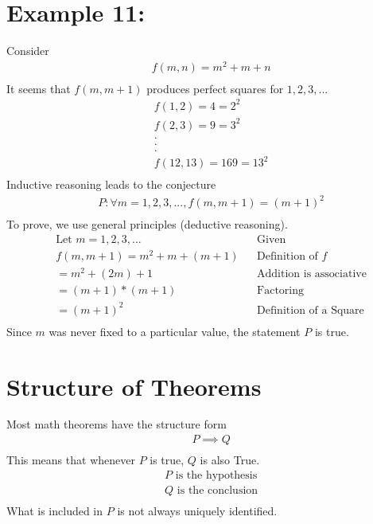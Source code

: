 \documentclass{article}
\begin{document}
\section{Example 11:}
Consider
\begin{align*}
	& f(m,n) = m^2 + m + n \\
\end{align*}
It seems that $f(m, m+1)$ produces perfect squares for $1,2,3,...$
\begin{align*}
	& f(1,2) = 4 = 2^2 \\
	& f(2,3) = 9 = 3^2 \\
	& . \\
	& . \\
	& . \\
	& f(12,13) = 169 = 13^2 \\
\end{align*}
Inductive reasoning leads to the conjecture
\begin{align*}
	& P: \forall m = 1,2,3,..., f(m, m+1) = (m+1)^2 \\
\end{align*}
To prove, we use general principles (deductive reasoning).\\
\begin{align*}
 	& \text{Let } m = 1,2,3,...  && \text{Given} \\
 	& f(m, m+1) = m^2 + m + (m + 1) && \text{Definition of }f \\
 	& = m^2 + (2m) + 1 && \text{Addition is associative} \\
 	& = (m+1) * (m+1) && \text{Factoring} \\
 	& = (m+1)^2 && \text{Definition of a Square}\\
\end{align*}
Since $m$ was never fixed to a particular value, the statement $P$ is true.
\section{Structure of Theorems}
Most math theorems have the structure form
\begin{align*}
 	& P \implies Q \\
\end{align*}
This means that whenever $P$ is true, $Q$ is also True.
\begin{align*}
 	& P \text{ is the hypothesis} \\
 	& Q \text{ is the conclusion} \\
\end{align*}
What is included in $P$ is not always uniquely identified.
\end{document}
